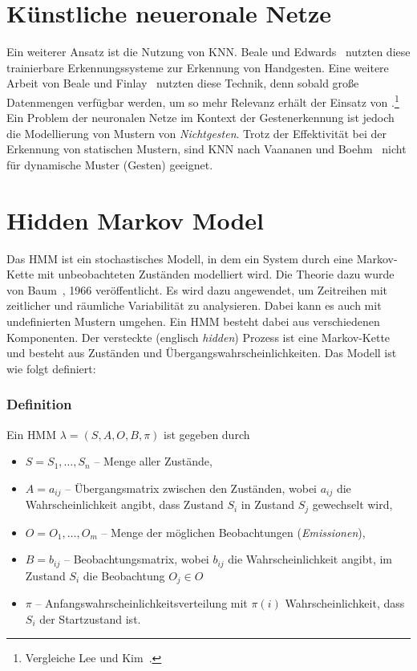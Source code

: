 \section{K\"unstliche neueronale Netze}
Ein weiterer Ansatz ist die Nutzung von \gls{KNN}. Beale und Edwards~\cite{bib:beale} nutzten diese trainierbare Erkennungssysteme zur Erkennung von Handgesten. Eine weitere Arbeit von Beale und Finlay~\cite{bib:finlay} nutzten diese Technik, denn sobald gro\ss e Datenmengen verf\"ugbar werden, um so mehr Relevanz erh\"alt der Einsatz von .\footnote{Vergleiche Lee und Kim~\cite{bib:hmmlee}.}
\newline
Ein Problem der neuronalen Netze im Kontext der Gestenerkennung ist jedoch die Modellierung von Mustern von \textit{Nichtgesten}. Trotz der Effektivit\"at bei der Erkennung von statischen Mustern, sind \gls{KNN} nach Vaananen und Boehm~\cite{bib:vaananen} nicht f\"ur dynamische Muster (Gesten) geeignet.

\section{Hidden Markov Model}
Das \gls{HMM} ist ein stochastisches Modell, in dem ein System durch eine Markov-Kette mit unbeobachteten Zust\"anden modelliert wird. Die Theorie dazu wurde von Baum~\cite{bib:hmmbaum}, 1966 ver\"offentlicht.
\newline
Es wird dazu angewendet, um Zeitreihen mit zeitlicher und r\"aumliche Variabilit\"at zu analysieren. Dabei kann es auch mit undefinierten Mustern umgehen. Ein \gls{HMM} besteht dabei aus verschiedenen Komponenten.
\newline
Der versteckte (englisch \textit{hidden}) Prozess ist eine Markov-Kette und besteht aus Zust\"anden und \"Ubergangswahrscheinlichkeiten.
Das Modell ist wie folgt definiert:

\subsubsection{Definition}
Ein \gls{HMM} $\lambda = (S, A, O, B, \pi)$ ist gegeben durch
\begin{itemize}
  \item $S = {S_1,\ldots,S_n}$ -- Menge aller Zust\"ande,
  \item $A = {a_{ij}}$ -- \"Ubergangsmatrix zwischen den Zust\"anden, wobei $a_{ij}$ die Wahrscheinlichkeit angibt, dass Zustand $S_i$ in Zustand $S_j$ gewechselt wird,
  \item $O = {O_1,\ldots,O_m}$ -- Menge der m\"oglichen Beobachtungen (\textit{Emissionen}),
  \item $B = {b_{ij}}$ -- Beobachtungsmatrix, wobei $b_{ij}$ die Wahrscheinlichkeit angibt, im Zustand $S_i$ die Beobachtung $O_j \in O$
  \item $\pi$ -- Anfangswahrscheinlichkeitsverteilung mit $\pi (i)$ Wahrscheinlichkeit, dass $S_i$ der Startzustand ist.
\end{itemize}

